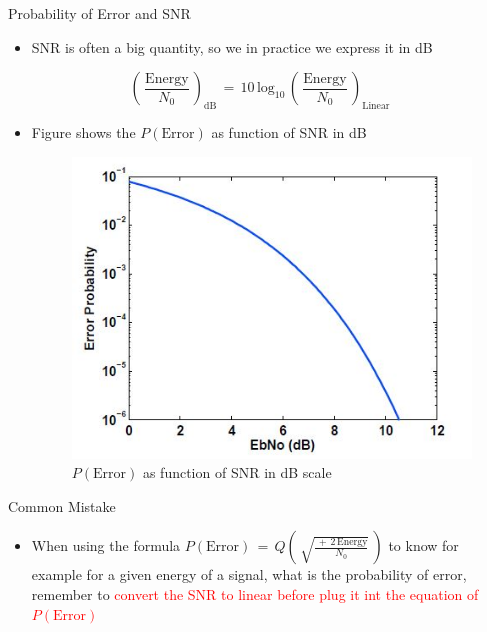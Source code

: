 \documentclass{Beamer}
\begin{document}
\begin{frame}[t,allowframebreaks]{Probability of Error and SNR}
\begin{itemize}
\item SNR is often a big quantity, so we in practice we express it in dB
\end{itemize}

\begin{equation}
 \left( \,  \displaystyle\frac{\text{Energy}}{N_0}  \,\right)_{\text{dB}} \, = \, 10 \, \text{log}_{10} \,  \left( \,  \displaystyle\frac{\text{Energy}}{N_0}  \,\right)_{\text{Linear}}
\end{equation}

\begin{itemize}

\item Figure shows the $P(\text{Error})$ as function of SNR in dB

\begin{figure}[h]
\centering
\includegraphics[scale=0.6]{Figures/Baseband_Binary/error_snr_dB}
\caption{$P(\text{Error})$ as function of SNR in dB scale}
\label{fig:Baseband_Binary:error_snr_dB}
\end{figure}

\end{itemize}

\end{frame}


\begin{frame}[t]{Common Mistake}

\begin{itemize}

\item When using the formula $ P(\text{Error}) \, = \, Q \left(\, \displaystyle\sqrt{\frac{ \, + \, 2 \, \text{Energy} }{N_0}}  \, \right)$ to know for example for a given energy of a signal, what is the probability of error, remember to \textcolor{red}{convert the SNR to linear before plug it int the equation of $P(\text{Error})$}

\end{itemize}

\end{frame}
\end{document}
